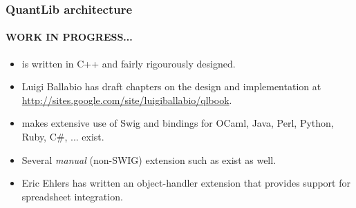 \documentclass[compress]{beamer}
\begin{document}
\begin{frame}
  \frametitle{QuantLib architecture}
  \framesubtitle{WORK IN PROGRESS...}
  \begin{itemize}
  \item \QL is written in C++ and fairly rigourously designed.
  \item Luigi Ballabio has draft chapters on the \Ql design and
    implementation at \url{http://sites.google.com/site/luigiballabio/qlbook}.
  \item \QL makes extensive use of Swig and bindings for OCaml, Java, Perl,
    Python, Ruby, C\#, ... exist.
  \item Several \textsl{manual} (non-SWIG) extension such as 
    exist as well.
  \item Eric Ehlers has written an object-handler extension that provides support for spreadsheet
    integration.
  \end{itemize}
\end{frame}
\end{document}
